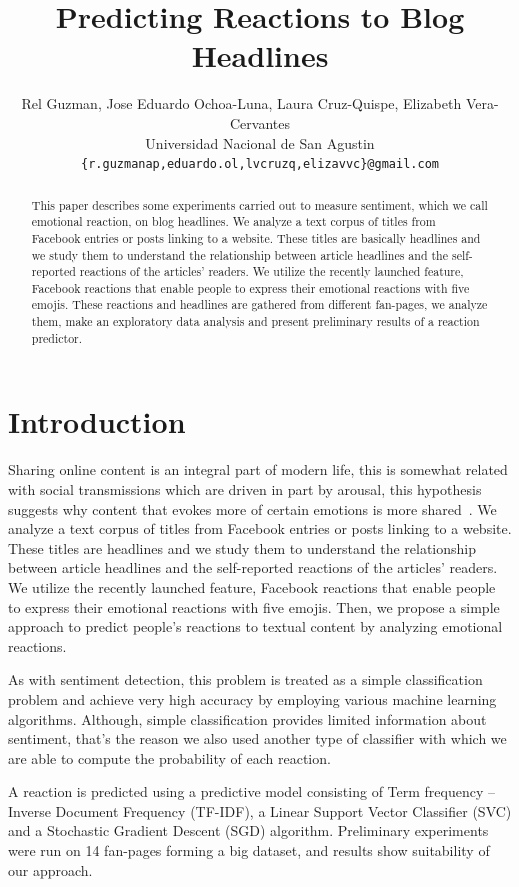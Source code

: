 \documentclass[10pt]{article}
\title{Predicting Reactions to Blog Headlines}
\author{Rel Guzman, Jose Eduardo Ochoa-Luna, Laura Cruz-Quispe, Elizabeth Vera-Cervantes \\
Universidad Nacional de San Agustin \\
  {\tt \{r.guzmanap,eduardo.ol,lvcruzq,elizavvc\}@gmail.com} \\}
\date{}
\begin{document}
\maketitle
\begin{abstract}

This paper describes some experiments carried out to measure sentiment, which we call emotional reaction, on blog headlines. We analyze a text corpus of titles from Facebook entries or posts linking to a website. These titles are basically headlines and we study them to understand the relationship between article headlines and the self-reported reactions of the articles' readers. We utilize the recently launched feature, Facebook reactions that enable people to express their emotional reactions with five emojis. These reactions and headlines are gathered from different fan-pages, we analyze them, make an exploratory data analysis and present preliminary results of a reaction predictor.

\end{abstract}


\section{Introduction}

Sharing online content is an integral part of modern life, this is somewhat related with social transmissions which are driven in part by arousal, this hypothesis suggests why content that evokes more of certain emotions is more shared~\cite{berger2011arousal}. We analyze a text corpus of titles from Facebook entries or posts linking to a website. These titles are headlines and we study them to understand the relationship between article headlines and the self-reported reactions of the articles' readers. We utilize the recently launched feature, Facebook reactions that enable people to express their emotional reactions with five emojis. Then, we propose a simple approach to predict people's reactions to textual content by analyzing emotional reactions. 

As with sentiment detection, this problem is treated as a simple classification problem and achieve very high accuracy by employing various machine learning algorithms. Although, simple classification provides limited information about sentiment, that's the reason we also used another type of classifier with which we are able to compute the probability of each reaction.

A reaction is predicted using a predictive model consisting of Term frequency – Inverse Document Frequency (TF-IDF), a Linear Support Vector Classifier (SVC) and a Stochastic Gradient Descent (SGD) algorithm. Preliminary experiments were run on 14 fan-pages forming a big dataset, and results show suitability of our approach. 
\end{document}

